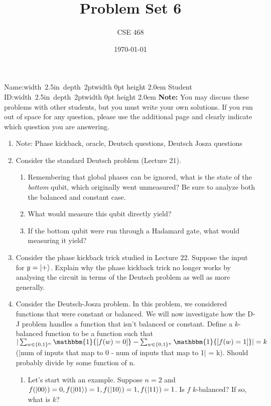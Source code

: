 \documentclass[12pt]{article}
\title{Problem Set 6}
\author{CSE 468}
\date{\today}
\newcommand{\NameBlank}{\mbox{\hskip 4pt\vrule width 2.5in depth 2pt}\vrule width 0pt height 2.0em}
\begin{document}
\maketitle

\noindent Name:\NameBlank{} \newline
\noindent Student ID:\NameBlank{} \newline
\textbf{Note:} You may discuss these problems with other students, but you must write your own solutions. If you run out of space for any question, please use the additional page and clearly indicate which question you are answering.

\begin{enumerate}[font=\bfseries]

    \item Note: Phase kickback, oracle, Deutsch questions, Deutsch Josza questions
    \item Consider the standard Deutsch problem (Lecture 21).
    \begin{enumerate}
        \item Remembering that global phases can be ignored, what is the state of the \emph{bottom} qubit, which originally went unmeasured? Be sure to analyze both the balanced and constant case.
        \item What would measure this qubit directly yield?
        \item If the bottom qubit were run through a Hadamard gate, what would measuring it yield?
    \end{enumerate}
    \item Consider the phase kickback trick studied in Lecture 22. Suppose the input for $y = \ket{+}$. Explain why the phase kickback trick no longer works by analysing the circuit in terms of the Deutsch problem as well as more generally.
    \item Consider the Deutsch-Josza problem. In this problem, we considered functions that were constant or balanced. We will now investigate how the D-J problem handles a function that isn't balanced or constant. Define a $k$-balanced function to be a function such that $|\sum_{w\in\{0,1\}^n} \mathbbm{1}{[f(w) = 0]} - \sum_{w\in\{0,1\}^n} \mathbbm{1}{[f(w) = 1]}| = k$ (|num of inputs that map to 0 - num of inputs that map to 1| = k). Should probably divide by some function of n.
    \begin{enumerate}
        \item Let's start with an example. Suppose $n = 2$ and $f(\ket{00}) = 0, f(\ket{01}) = 1, f(\ket{10}) = 1, f(\ket{11}) = 1$. Is $f$ $k$-balanced? If so, what is $k$?

\end{enumerate}
\end{enumerate}
\end{document}
